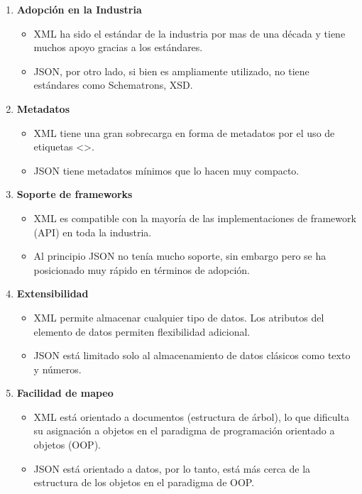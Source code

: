 \begin{enumerate}
    \item \textbf{Adopción en la Industria}
    \begin{itemize}
        \item XML ha sido el estándar de la industria por mas de una década y tiene muchos apoyo gracias a los estándares.
        \item JSON, por otro lado, si bien es ampliamente utilizado, no tiene estándares como Schematrons, XSD.
    \end{itemize}
    
    \item \textbf{Metadatos}
    \begin{itemize}
        \item XML tiene una gran sobrecarga en forma de metadatos por el uso de etiquetas \textless \textgreater.
        \item JSON tiene metadatos mínimos que lo hacen muy compacto.
    \end{itemize}
    
    \item \textbf{Soporte de frameworks}
    \begin{itemize}
        \item XML es compatible con la mayoría de las implementaciones de framework (API) en toda la industria.
        \item Al principio JSON no tenía mucho soporte, sin embargo pero se ha posicionado muy rápido en términos de adopción.
    \end{itemize}
    
    \item \textbf{Extensibilidad}
    \begin{itemize}
        \item XML permite almacenar cualquier tipo de datos. Los atributos del elemento de datos permiten flexibilidad adicional.
        \item JSON está limitado solo al almacenamiento de datos clásicos como texto y números.
    \end{itemize}
    
    \item \textbf{Facilidad de mapeo}
    \begin{itemize}
        \item XML está orientado a documentos (estructura de árbol), lo que dificulta su asignación a objetos en el paradigma de programación orientado a objetos (OOP).
        \item JSON está orientado a datos, por lo tanto, está más cerca de la estructura de los objetos en el paradigma de OOP.
    \end{itemize}
    

\end{enumerate}
